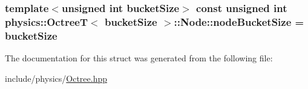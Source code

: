 \hypertarget{structphysics_1_1OctreeT_1_1Node_a004aad237ee1e8a63ef1b3ae7c9862b9}{
\subsubsection[{node\-Bucket\-Size}]{\setlength{\rightskip}{0pt plus 5cm}template$<$unsigned int bucket\-Size$>$ const unsigned int {\bf physics\-::\-Octree\-T}$<$ bucket\-Size $>$\-::Node\-::node\-Bucket\-Size = bucket\-Size\hspace{0.3cm}{\ttfamily [static]}}}\label{structphysics_1_1OctreeT_1_1Node_a004aad237ee1e8a63ef1b3ae7c9862b9}


The documentation for this struct was generated from the following file\-:\begin{DoxyCompactItemize}
\item 
include/physics/\hyperlink{Octree_8hpp}{Octree.\-hpp}\end{DoxyCompactItemize}
